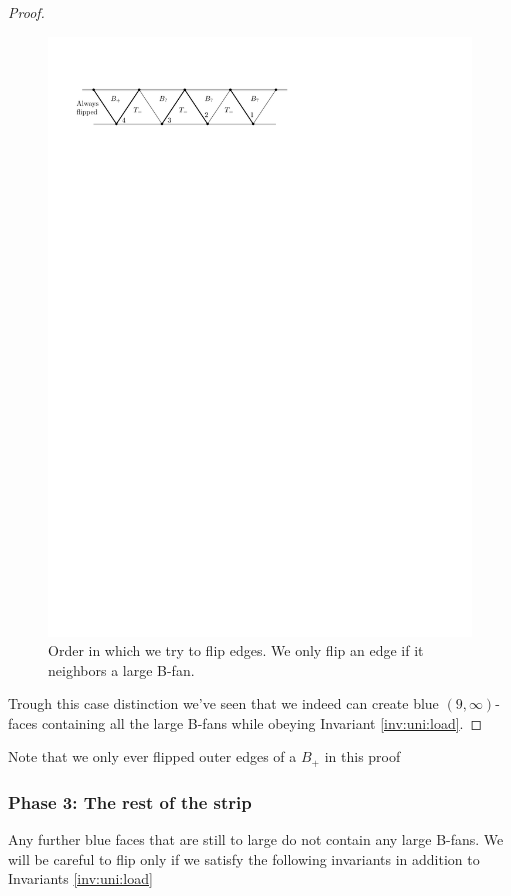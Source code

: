 \begin{proof}
  \begin{figure}[h]
    \centering
    \includegraphics[scale=1]{unifiedAlgo/img/placeEdges}
    \caption{Order in which we try to flip edges. We only flip an edge if it neighbors a large B-fan.}
    \label{fig:uni:placeedges}
  \end{figure}

  Trough this case distinction we've seen that we indeed can create blue $(9,\infty)$-faces containing all the large B-fans while obeying Invariant \ref{inv:uni:load}.

\end{proof}

  Note that we only ever flipped outer edges of a $B_+$ in this proof


\subsubsection{Phase 3: The rest of the strip}
Any further blue faces that are still to large do not contain any large B-fans. We will be careful to flip only if we satisfy the following invariants in addition to Invariants \ref{inv:uni:load}

